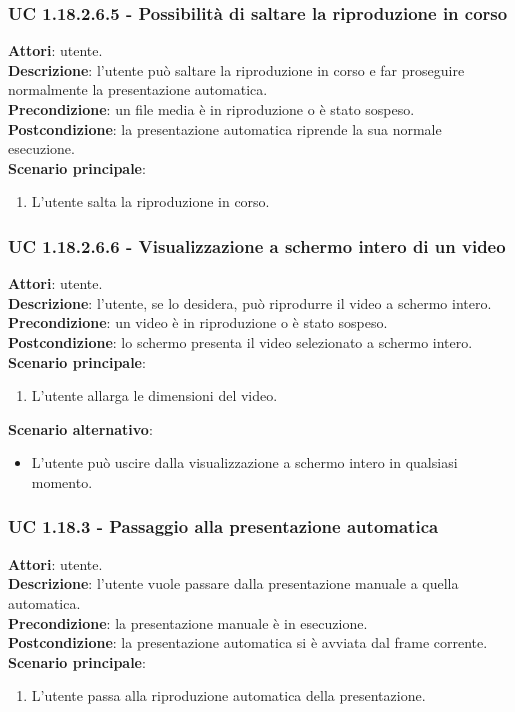 	\subsubsection{UC 1.18.2.6.5 - Possibilità di saltare la riproduzione in corso}{
		\label{uc1.18.2.6.5}
		\textbf{Attori}: utente. \\
		\textbf{Descrizione}: l'utente può saltare la riproduzione in corso e far proseguire normalmente la presentazione automatica. \\
		\textbf{Precondizione}: un file media è in riproduzione o è stato sospeso.	\\
		\textbf{Postcondizione}: la presentazione automatica riprende la sua normale esecuzione.\\
		\textbf{Scenario principale}:
		\begin{enumerate}
			\item L'utente salta la riproduzione in corso.
		\end{enumerate}						
	}
	\subsubsection{UC 1.18.2.6.6 - Visualizzazione a schermo intero di un video}{
		\label{uc1.18.2.6.6}
		\textbf{Attori}: utente. \\
		\textbf{Descrizione}: l'utente, se lo desidera, può riprodurre il video a schermo intero. \\
		\textbf{Precondizione}: un video è in riproduzione o è stato sospeso.	\\
		\textbf{Postcondizione}: lo schermo presenta il video selezionato a schermo intero.\\
		\textbf{Scenario principale}:
		\begin{enumerate}
			\item L'utente allarga le dimensioni del video.
		\end{enumerate}	
		\textbf{Scenario alternativo}:
		\begin{itemize}
			\item L'utente può uscire dalla visualizzazione a schermo intero in qualsiasi momento.
		\end{itemize}
	}
	\subsubsection{UC 1.18.3 - Passaggio alla presentazione automatica}{
		\label{uc1.18.3}
		\textbf{Attori}: utente. \\
		\textbf{Descrizione}: l'utente vuole passare dalla presentazione manuale a quella automatica. \\
		\textbf{Precondizione}: la presentazione manuale è in esecuzione.	\\
		\textbf{Postcondizione}: la presentazione automatica si è avviata dal frame corrente.\\
		\textbf{Scenario principale}:
		\begin{enumerate}
			\item L'utente passa alla riproduzione automatica della presentazione.
		\end{enumerate}						
	}
